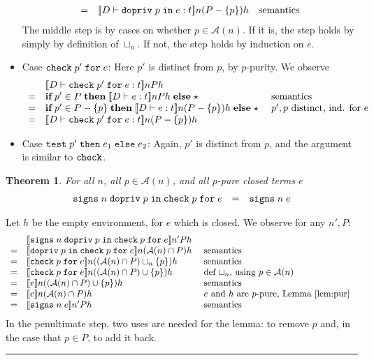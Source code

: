 \documentclass[submission,copyright,creativecommons]{eptcs}
\newcommand{\blackslug}{\rule{7pt}{7pt}}
\newcommand{\mifthenelse}[3]{\MIF\;#1\;\MTHEN\;#2\;\MELSE\;#3}
\newcommand{\enable}[2]{\ENABLE\;#1\;\IN\;#2}
\newcommand{\chk}[2]{\CHK\;#1\;\FOR\;#2}
\newcommand{\test}[3]{\TEST\;#1\;\THEN\;#2\;\ELSE\;#3}
\newcommand{\signs}[2]{\SIGNS\;#1\;#2}
\newcommand{\ELSE}{\mbox{\texttt{else}}}
\newcommand{\FOR}{\mbox{\texttt{for}}}
\newcommand{\IN}{\mbox{\texttt{in}}}
\newcommand{\THEN}{{\texttt{then}}}
\newcommand{\MTHEN}{{\textbf{then}}}
\newcommand{\MELSE}{{\textbf{else}}}
\newcommand{\MIF}{{\textbf{if}}}
\newcommand{\A}{\mathcal{A}}
\newcommand{\ldb}{[\![}
\newcommand{\rdb}{]\!]}
\newcommand{\means}[1]{\ldb {#1}\rdb}
\newcommand{\union}{\cup}
\newcommand{\intersect}{\cap}
\newcommand{\proves}{\vdash}
\newcommand{\ENABLE}{\mbox{\texttt{dopriv}}}
\newcommand{\CHK}{\mbox{\texttt{check}}}
\newcommand{\TEST}{\mbox{\texttt{test}}}
\newcommand{\SIGNS}{\mbox{\texttt{signs}}}
\newcommand{\D}{D} \newcommand{\ty}{t} \renewcommand{\th}{\theta}
\newcommand{\n}{n} \newcommand{\p}{p} \newcommand{\Ps}{\Pi} \newcommand{\h}{h}
\newtheorem{theorem}{Theorem}[section]
\newenvironment{proof}{\begin{trivlist}\item[\hskip\labelsep{\bf
Proof:}]}{\blackslug\end{trivlist}}
\newenvironment{xproof}{\begin{trivlist}\item[\hskip\labelsep{\bf  
Proof:}]}{\end{trivlist}}
\begin{document}
\begin{xproof}
\begin{itemize}
\[\begin{array}{cll}
= & \means{\D\proves\enable{\p}{e}:\ty}\n (P-\{\p\}) \h& \mbox{semantics}
\end{array} \]
The middle step is by cases on whether $\p\in\A(\n)$.  If it is, the
step holds by simply by definition of $\sqcup_{\n}$.  If not, the step
holds by induction on $e$.
\item Case $\chk{\p'}{e}$: Here $\p'$ is distinct from $\p$, by $\p$-purity.
We observe
\[\begin{array}{cll}
 & \means{\D\proves \chk{\p'}{e}:\ty}\n P \h\\
= & \mifthenelse{\p'\in P}{ \means{\D\proves e:\ty}\n P\h}{\star} &\mbox{  semantics}\\
= & \mifthenelse{\p'\in P-\{\p\}}{ \means{\D\proves e:\ty}\n (P-\{\p\}) \h}{\star} 
     &\mbox{  $\p',\p$ distinct, ind. for $e$}\\ 
= & \means{\D\proves \chk{\p'}{e}:\ty}\n (P-\{\p\}) \h
\end{array}
\]
\item Case $\test{\p'}{e_1}{e_2}$: Again, $\p'$ is distinct from $\p$,
and the argument is similar to $\CHK$.  
\end{itemize}
\end{xproof} 

\begin{theorem}
\label{thm:elim}
For all $\n$, all $\p\in\A(\n)$, and all  $\p$-pure closed terms $e$
\[
\begin{array}{lcl}
\signs{\n}{ \enable{\p}{ \chk{\p}{e}}} 
& = & \signs{\n}{ e } 
\end{array}
\]  
\end{theorem}
\begin{proof}
Let $\h$ be the empty environment, for $e$ which is closed.
We observe for any $\n',P$:
\[\begin{array}{cll}
& \means{ \signs{\n}{ \enable{\p}{ \chk{\p}{e}}} }\n' P\h \\
=&\means{ \enable{\p}{ \chk{\p}{e}} }\n(\A(\n)\intersect P)\h & \mbox{ semantics}\\
=&\means{  \chk{\p}{e} }\n((\A(\n)\intersect P)\sqcup_{\n}\{\p\})\h & \mbox{ semantics}\\
=&\means{  \chk{\p}{e} }\n((\A(\n)\intersect P)\union\{\p\})\h & 
  \mbox{ def $\sqcup_{\n}$, using $\p\in\A(\n)$}\\ 
=&\means{  e }\n((\A(\n)\intersect P)\union\{\p\})\h & \mbox{ semantics}\\
=&\means{  e }\n(\A(\n)\intersect P)\h & \mbox{ $e$ and $\h$ are $\p$-pure,
  Lemma~\ref{lem:pur} } \\
=&\means{ \signs{\n}{e} }\n' P\h & \mbox{ semantics}
\end{array} \]
In the penultimate step, two uses are needed for the lemma: to remove
$\p$ and, in the case that $\p\in P$, to add it back.
\end{proof}
\end{document}

